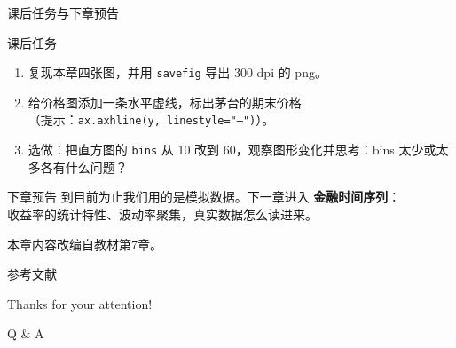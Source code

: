 \documentclass[9pt]{ctexbeamer}
\begin{document}
\begin{frame}{课后任务与下章预告}
	\begin{block}{课后任务}
		\begin{enumerate}
			\item 复现本章四张图，并用 \texttt{savefig} 导出 300 dpi 的 png。
			\item 给价格图添加一条水平虚线，标出茅台的期末价格\\
			（提示：\texttt{ax.axhline(y, linestyle="--")}）。
			\item 选做：把直方图的 \texttt{bins} 从 10 改到 60，观察图形变化并思考：bins 太少或太多各有什么问题？
		\end{enumerate}
	\end{block}
	\begin{exampleblock}{下章预告}
		到目前为止我们用的是模拟数据。下一章进入 \textbf{金融时间序列}：\\
		收益率的统计特性、波动率聚集，真实数据怎么读进来。
	\end{exampleblock}
	\begin{center}
		\vspace{0.5em}
		本章内容改编自教材第7章\citep{hilpisch2018python}。
	\end{center}
\end{frame}


\appendix

\begin{frame}[allowframebreaks]{参考文献}
	
	
\end{frame}

\begin{frame}
	\begin{center}
		{\Huge\calligra Thanks for your attention!}
		\vspace{1cm}

		{\Huge Q \& A}
	\end{center}
\end{frame}
\end{document}
